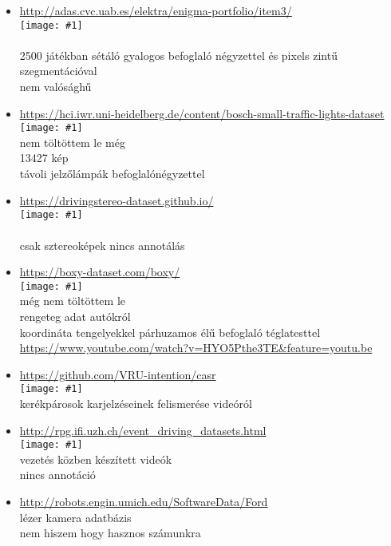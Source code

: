 \documentclass[12pt]{report}
\newcommand{\img}[1]{\texttt{[image: \#1]}}
\begin{document}
\begin{itemize}
	\\\img{11}
	\\
	\\pixel szintű szegmentáció
	\\de csak 150 kép
	\item \url{http://adas.cvc.uab.es/elektra/enigma-portfolio/item3/}
	\\\img{12}
	\\
	\\2500 játékban sétáló gyalogos befoglaló négyzettel és pixels zintű szegmentációval
	\\nem valósághű 
	\item \url{https://hci.iwr.uni-heidelberg.de/content/bosch-small-traffic-lights-dataset}
	\\\img{13}
	\\nem töltöttem le még
	\\13427 kép
	\\távoli jelzőlámpák befoglalónégyzettel
	\item \url{https://drivingstereo-dataset.github.io/}
	\\\img{14}
	\\
	\\csak sztereoképek nincs annotálás
	\item \url{https://boxy-dataset.com/boxy/}
	\\\img{15}
	\\még nem töltöttem le
	\\rengeteg adat autókról
	\\koordináta tengelyekkel párhuzamos élű befoglaló téglatesttel
	\\\url{https://www.youtube.com/watch?v=HYO5Pthe3TE&feature=youtu.be}
	\item \url{https://github.com/VRU-intention/casr}
	\\\img{16}
	\\kerékpárosok karjelzéseinek felismerése videóról
	\item \url{http://rpg.ifi.uzh.ch/event_driving_datasets.html}
	\\\img{17}
	\\vezetés közben készített videók
	\\nincs annotáció
	\item \url{http://robots.engin.umich.edu/SoftwareData/Ford}
	\\lézer kamera adatbázis
	\\nem hiszem hogy hasznos számunkra

\end{itemize}
\end{document}
